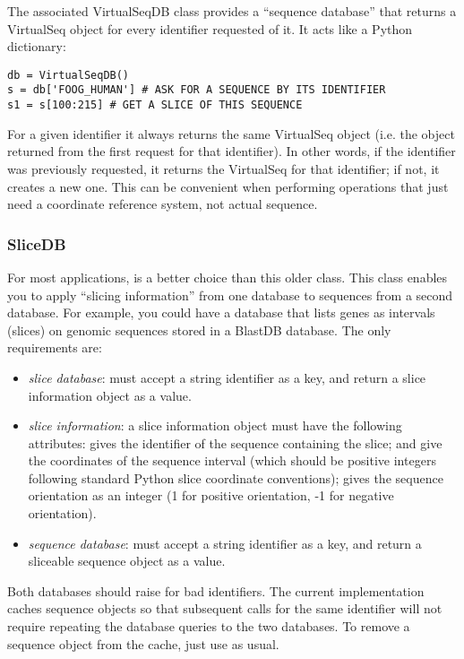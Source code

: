 \documentclass{howto}
\begin{document}
The associated VirtualSeqDB class provides a ``sequence database''
that returns a VirtualSeq object for every identifier requested of
it.  It acts like a Python dictionary:
\begin{verbatim}
db = VirtualSeqDB()
s = db['FOOG_HUMAN'] # ASK FOR A SEQUENCE BY ITS IDENTIFIER
s1 = s[100:215] # GET A SLICE OF THIS SEQUENCE
\end{verbatim}
For a given identifier it always returns the same VirtualSeq
object (i.e. the object returned from the first request for that identifier).
In other words, if the identifier was previously requested,
it returns the VirtualSeq for that identifier; if not, it 
creates a new one.
This can be convenient when performing operations that just
need a coordinate reference system, not actual sequence.




\subsubsection{SliceDB}
For most applications,  is a better choice than
this older class.
This class enables you to apply ``slicing information'' from 
one database to sequences from a second database.  For example,
you could have a database that lists genes as intervals (slices)
on genomic sequences stored in a BlastDB database.  The only
requirements are:
\begin{itemize}
\item
{\em slice database}: must accept a string identifier as a key,
and return a slice information object as a value.

\item
{\em slice information}: a slice information object must
have the following attributes:  gives the identifier
of the sequence containing the slice;  and 
give the coordinates of the sequence interval (which should be positive
integers following standard
Python slice coordinate conventions);  gives the sequence
orientation as an integer (1 for positive orientation, -1 for
negative orientation).

\item
{\em sequence database}: must accept a string identifier as a key,
and return a sliceable sequence object as a value.

\end{itemize}

Both databases should raise  for bad identifiers.
The current  implementation caches sequence objects so
that subsequent calls for the same identifier will not require
repeating the database queries to the two databases.  To
remove a sequence object from the cache, just use
 as usual.
\end{document}
